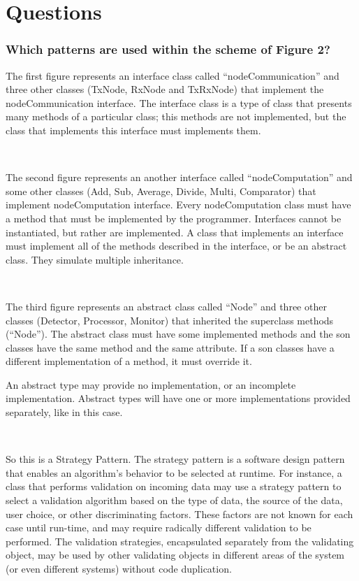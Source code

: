 \documentclass[a4paper,titlepage]{article}
\begin{document}
 
\newpage
\part{Questions}

\section*{ Which patterns are used within the scheme of Figure 2?}

The first figure represents an interface class called ``nodeCommunication'' and three other classes (TxNode, RxNode and TxRxNode) that implement the nodeCommunication interface. The interface class is a type of class that presents many methods of a particular class; this methods are not implemented, but the class that implements this interface must implements them.

~

The second figure represents an another interface called ``nodeComputation'' and some other classes (Add, Sub, Average, Divide, Multi, Comparator) that implement nodeComputation interface. Every nodeComputation class must have a method that must be implemented by the programmer. Interfaces cannot be instantiated, but rather are implemented. A class that implements an interface must implement all of the methods described in the interface, or be an abstract class. They simulate multiple inheritance.

~

The third figure represents an abstract class called ``Node'' and three other classes (Detector, Processor, Monitor) that inherited the superclass methods (``Node''). The abstract class must have some implemented methods and the son classes have the same method and the same attribute. If a son classes have a different implementation of a method, it must override it.

An abstract type may provide no implementation, or an incomplete implementation. Abstract types will have one or more implementations provided separately, like in this case.

~

So this is a Strategy Pattern. The strategy pattern is a software design pattern that enables an algorithm's behavior to be selected at runtime. For instance, a class that performs validation on incoming data may use a strategy pattern to select a validation algorithm based on the type of data, the source of the data, user choice, or other discriminating factors. These factors are not known for each case until run-time, and may require radically different validation to be performed. The validation strategies, encapsulated separately from the validating object, may be used by other validating objects in different areas of the system (or even different systems) without code duplication.
\end{document}
